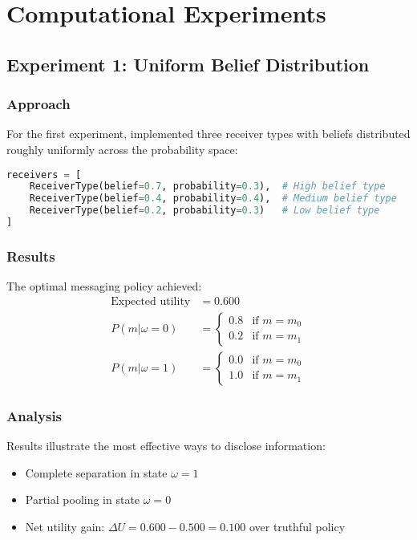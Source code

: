 \documentclass[12pt]{article}
\theoremstyle{plain}
\theoremstyle{definition}
\theoremstyle{remark}
\begin{document}
\section{Computational Experiments}

\subsection{Experiment 1: Uniform Belief Distribution}

\subsubsection{Approach}
For the first experiment, implemented three receiver types with beliefs distributed roughly uniformly across the probability space:

\begin{lstlisting}[language=Python, caption=Experiment 1 Setup]
receivers = [
    ReceiverType(belief=0.7, probability=0.3),  # High belief type
    ReceiverType(belief=0.4, probability=0.4),  # Medium belief type
    ReceiverType(belief=0.2, probability=0.3)   # Low belief type
]
\end{lstlisting}

\subsubsection{Results}
The optimal messaging policy achieved:
\begin{align*}
    \text{Expected utility} &= 0.600 \\
    P(m|\omega=0) &= \begin{cases}
        0.8 & \text{if } m = m_0 \\
        0.2 & \text{if } m = m_1
    \end{cases} \\
    P(m|\omega=1) &= \begin{cases}
        0.0 & \text{if } m = m_0 \\
        1.0 & \text{if } m = m_1
    \end{cases}
\end{align*}

\subsubsection{Analysis}
Results illustrate the most effective ways to disclose information:
\begin{itemize}
    \item Complete separation in state $\omega=1$
    \item Partial pooling in state $\omega=0$
    \item Net utility gain: $\Delta U = 0.600 - 0.500 = 0.100$ over truthful policy
\end{itemize}
\end{document}
